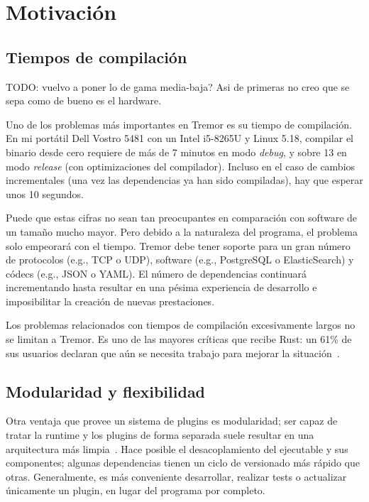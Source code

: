 \section{Motivación}

\subsection{Tiempos de compilación}

TODO: vuelvo a poner lo de gama media-baja? Asi de primeras no creo que se sepa
como de bueno es el hardware.

Uno de los problemas más importantes en Tremor es su tiempo de compilación. En
mi portátil Dell Vostro 5481 con un Intel i5-8265U y Linux 5.18, compilar el
binario  desde cero requiere de más de 7 minutos en modo
\emph{debug}, y sobre 13 en modo \emph{release} (con optimizaciones del
compilador). Incluso en el caso de cambios incrementales (una vez las
dependencias ya han sido compiladas), hay que esperar unos 10 segundos.

Puede que estas cifras no sean tan preocupantes en comparación con software de
un tamaño mucho mayor. Pero debido a la naturaleza del programa, el problema
solo empeorará con el tiempo. Tremor debe tener soporte para un gran número de
protocolos (e.g., TCP o UDP), software (e.g., PostgreSQL o ElasticSearch) y
códecs (e.g., JSON o YAML). El número de dependencias continuará incrementando
hasta resultar en una pésima experiencia de desarrollo e imposibilitar la
creación de nuevas prestaciones.

Los problemas relacionados con tiempos de compilación excesivamente largos no se
limitan a Tremor. Es uno de las mayores críticas que recibe Rust: un 61\% de sus
usuarios declaran que aún se necesita trabajo para mejorar la
situación~\cite{rustsurvey}.

\subsection{Modularidad y flexibilidad}

Otra ventaja que provee un sistema de plugins es modularidad; ser capaz de
tratar la runtime y los plugins de forma separada suele resultar en una
arquitectura más limpia~\cite{baldwin2000design}. Hace posible el
desacoplamiento del ejecutable y sus componentes; algunas dependencias tienen un
ciclo de versionado más rápido que otras. Generalmente, es más conveniente
desarrollar, realizar tests o actualizar únicamente un plugin, en lugar del
programa por completo.

